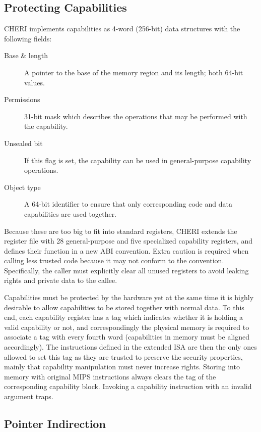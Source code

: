 \documentclass[a4paper,12pt,twoside,openright]{report}
\begin{document}
\subsection{Protecting Capabilities}

CHERI implements capabilities as 4-word (256-bit) data structures with the following fields:
\begin{description}
	\item[Base \& length] A pointer to the base of the memory region and its length; both 64-bit values.
	\item[Permissions] 31-bit mask which describes the operations that may be performed with the capability.
	\item[Unsealed bit] If this flag is set, the capability can be used in general-purpose capability operations.
	\item[Object type] A 64-bit identifier to ensure that only corresponding code and data capabilities are used together.
\end{description}

Because these are too big to fit into standard registers, CHERI extends the register file with 28 general-purpose and five specialized capability registers, and defines their function in a new ABI convention. Extra caution is required when calling less trusted code because it may not conform to the convention. Specifically, the caller must explicitly clear all unused registers to avoid leaking rights and private data to the callee.

Capabilities must be protected by the hardware yet at the same time it is highly desirable to allow capabilities to be stored together with normal data. To this end, each capability register has a tag which indicates whether it is holding a valid capability or not, and correspondingly the physical memory is required to associate a tag with every fourth word (capabilities in memory must be aligned accordingly). The instructions defined in the extended ISA are then the only ones allowed to set this tag as they are trusted to preserve the security properties, mainly that capability manipulation must never increase rights. Storing into memory with original MIPS instructions always clears the tag of the corresponding capability block. Invoking a capability instruction with an invalid argument traps.

\subsection{Pointer Indirection}
\end{document}
